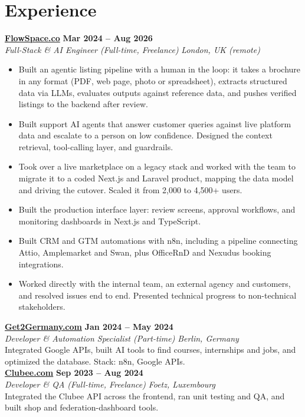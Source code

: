 \documentclass[a4paper,10pt]{article}
\newcommand{\role}[4]{%
 \textbf{#1} \hfill \textbf{#2}\\[1pt]%
 \textit{#3} \hfill \textit{#4}\\[2pt]%
}
\begin{document}
\section{Experience}

\role{\href{https://flowspace.co}{FlowSpace.co}}{Mar 2024 -- Aug 2026}{Full-Stack \& AI Engineer (Full-time, Freelance)}{London, UK (remote)}
\begin{itemize}
 \item Built an agentic listing pipeline with a human in the loop: it takes a brochure in any format (PDF, web page, photo or spreadsheet), extracts structured data via LLMs, evaluates outputs against reference data, and pushes verified listings to the backend after review.
 \item Built support AI agents that answer customer queries against live platform data and escalate to a person on low confidence. Designed the context retrieval, tool-calling layer, and guardrails.
 \item Took over a live marketplace on a legacy stack and worked with the team to migrate it to a coded Next.js and Laravel product, mapping the data model and driving the cutover. Scaled it from 2,000 to 4,500+ users.
 \item Built the production interface layer: review screens, approval workflows, and monitoring dashboards in Next.js and TypeScript.
 \item Built CRM and GTM automations with n8n, including a pipeline connecting Attio, Amplemarket and Swan, plus OfficeRnD and Nexudus booking integrations.
 \item Worked directly with the internal team, an external agency and customers, and resolved issues end to end. Presented technical progress to non-technical stakeholders.
\end{itemize}

\role{\href{https://get2germany.com}{Get2Germany.com}}{Jan 2024 -- May 2024}{Developer \& Automation Specialist (Part-time)}{Berlin, Germany}
Integrated Google APIs, built AI tools to find courses, internships and jobs, and optimized the database. Stack: n8n, Google APIs.\\[1pt]

\role{\href{https://clubee.com}{Clubee.com}}{Sep 2023 -- Aug 2024}{Developer \& QA (Full-time, Freelance)}{Foetz, Luxembourg}
Integrated the Clubee API across the frontend, ran unit testing and QA, and built shop and federation-dashboard tools.\\[1pt]
\end{document}
